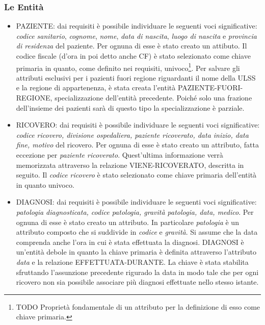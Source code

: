\documentclass{article}
\begin{document}
\subsubsection{Le Entità}
\begin{itemize}
	\item PAZIENTE: dai requisiti è possibile individuare le seguenti voci
	      significative: \textit{codice sanitario}, \textit{cognome},
	      \textit{nome}, \textit{data di nascita}, \textit{luogo di nascita} e
	      \textit{provincia di residenza} del paziente.
	      Per ognuna di esse è stato creato un attibuto. Il codice fiscale
	      (d'ora in poi detto anche CF) è stato selezionato come chiave
	      primaria in quanto,
	      come definito nei requisiti, univoco\footnote{TODO Proprietà fondamentale
		      di un attributo per la definizione di esso come chiave primaria.}.
	      Per salvare gli attributi esclusivi per i pazienti fuori regione
	      riguardanti il nome della ULSS e la regione di appartenenza, è stata
	      creata l'entità PAZIENTE-FUORI-REGIONE, specializzazione dell'entità
	      precedente.  Poiché solo una frazione dell'insieme dei pazienti sarà
	      di questo tipo la specializzazione è parziale.

	\item RICOVERO: dai requisiti è possibile individuare le seguenti voci
	      significative: \textit{codice ricovero, divisione ospedaliera,
		      paziente ricoverato, data inizio, data fine, motivo} del ricovero.
	      Per ognuna di esse è stato creato un attributo, fatta eccezione per
	      \textit{paziente ricoverato}. Quest'ultima informazione verrà
	      memorizzata attraverso la relazione VIENE-RICOVERATO, descritta
	      in seguito. Il \textit{codice ricovero} è stato selezionato come
	      chiave primaria dell'entità in quanto univoco.

	\item DIAGNOSI: dai requisiti è possibile individuare le seguenti voci
	      significative: \textit{patologia diagnosticata, codice patologia,
		      gravità patologia, data, medico}. Per ognuna di esse è stato
	      creato un attributo. In particolare \textit{patologia} è un
	      attributo composto che si suddivide in \textit{codice} e
	      \textit{gravità}. Si assume che la data comprenda anche l'ora in
	      cui è stata effettuata la diagnosi. DIAGNOSI è un'entità debole
	      in quanto la chiave primaria è definita attraverso l'attributo
	      \textit{data} e la relazione EFFETTUATA-DURANTE. La chiave è
	      stata stabilita sfruttando l'assunzione precedente rigurado la
	      data in modo tale che per ogni ricovero non sia possibile
	      associare più diagnosi effettuate nello stesso istante.


\end{itemize}
\end{document}
